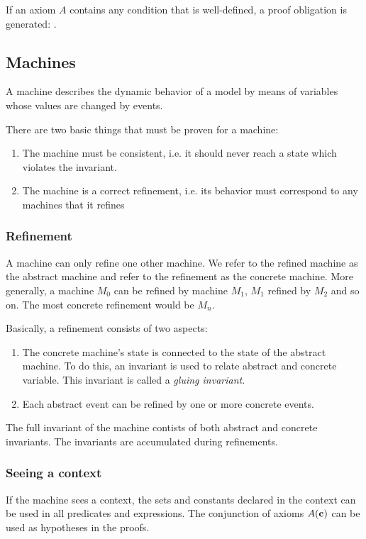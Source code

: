 If an axiom $A$ contains any condition that is well-defined, a proof obligation is generated:
.


\subsection{Machines}
A machine describes the dynamic behavior of a model by means of variables whose values are changed by events.

There are two basic things that must be proven for a machine:
\begin{enumerate}
	\item The machine must be consistent, i.e. it should never reach a state which violates the invariant.
	\item The machine is a correct refinement, i.e. its behavior must correspond to any machines that it refines
\end{enumerate}

\subsubsection{Refinement}
A machine can only refine one other machine. 
We refer to the refined machine as the abstract machine and refer to the refinement as the concrete machine. 
More generally, a machine $M_0$ can be refined by machine $M_1$, $M_1$ refined by $M_2$ 
and so on. The most concrete refinement would be $M_n$. 

Basically, a refinement consists of two aspects:
\begin{enumerate}
	\item The concrete machine's state is connected to the state of the
abstract machine. To do this, an invariant is used to relate abstract and concrete variable. This invariant is called a \emph{gluing invariant}. 
	\item Each abstract event can be refined by one or more
concrete events.
\end{enumerate}

The full invariant of the machine contists of both abstract and concrete invariants. 
The invariants are accumulated during refinements.

\subsubsection{Seeing a context}
If the machine sees a context, the sets and constants declared in the context can be used in
 all predicates and expressions.
The conjunction of axioms $A(\textbf{c})$ can be used as hypotheses in the proofs.

